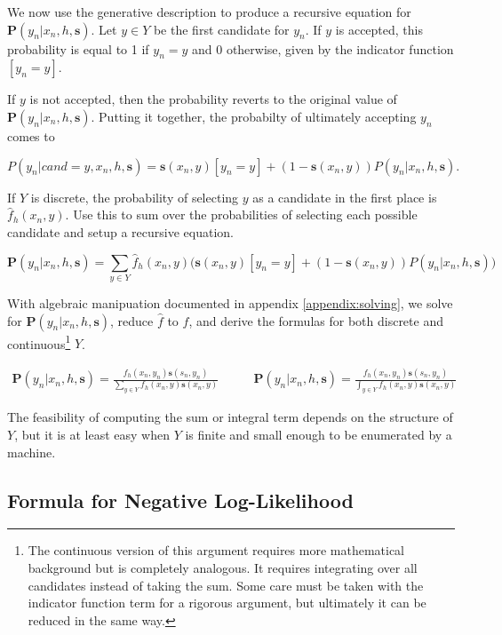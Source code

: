\documentclass[twoside]{article}
\begin{document}
We now use the generative description to produce a recursive equation for \(\mathbf{P}(y_n|x_n,h,\mathbf{s})\). Let \(y \in Y\) be the first candidate for \(y_n\). If \(y\) is accepted, this probability is equal to 1 if \(y_n = y\) and 0 otherwise, given by the indicator function \(\left [y_n = y\right ]\).

If \(y\) is not accepted, then the probability reverts to the original value of \(\mathbf{P}(y_n|x_n,h,\mathbf{s})\). Putting it together, the probabilty of ultimately accepting \(y_n\) comes to

\[P(y_n|cand=y,x_n,h,\mathbf{s})=\mathbf{s}(x_n,y)\left [y_n = y\right ] + (1-\mathbf{s}(x_n,y))P(y_n|x_n,h,\mathbf{s}).\]

If \(Y\) is discrete, the probability of selecting \(y\) as a candidate in the first place is \(\hat{f}_h(x_n, y)\). Use this to sum over the probabilities of selecting each possible candidate and setup a recursive equation.

\begin{equation}
\label{eq:bias_corrected_setup}
\mathbf{P}(y_n|x_n,h,\mathbf{s})=\sum_{y \in Y}\hat{f}_h(x_n,y)\big(\mathbf{s}(x_n,y)\left [y_n = y\right ] + (1-\mathbf{s}(x_n,y))P(y_n|x_n,h,\mathbf{s})\big)
\end{equation}

With algebraic manipuation documented in appendix \ref{appendix:solving}, we solve for \(\mathbf{P}(y_n|x_n,h,\mathbf{s})\), reduce \(\hat{f}\) to \(f\), and derive the formulas for both discrete and continuous\footnote{The continuous version of this argument requires more mathematical background but is completely analogous. It requires integrating over all candidates instead of taking the sum. Some care must be taken with the indicator function term for a rigorous argument, but ultimately it can be reduced in the same way.} \(Y\).

\begin{align}
\label{eq:bias_corrected_prob}
\mathbf{P}(y_n|x_n,h,\mathbf{s})=\frac{f_h(x_n,y_n)\mathbf{s}(s_n,y_n)}{\sum_{y \in Y}f_h(x_n,y)\mathbf{s}(x_n,y)} &
\qquad\mathbf{P}(y_n|x_n,h,\mathbf{s})=\frac{f_h(x_n,y_n)\mathbf{s}(s_n,y_n)}{\int_{y \in Y}f_h(x_n,y)\mathbf{s}(x_n,y)}
\end{align}

The feasibility of computing the sum or integral term depends on the structure of \(Y\), but it is at least easy when \(Y\) is finite and small enough to be enumerated by a machine.

\subsection{Formula for Negative Log-Likelihood}
\end{document}
